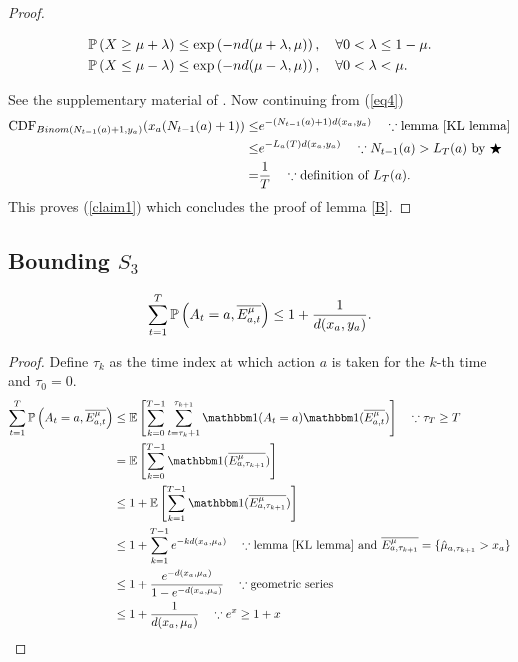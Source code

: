 \documentclass[11pt]{article}
\begin{document}
\begin{proof}
\begin{lemma}
\begin{align*}&\mathbb{P}\left( X\ge \mu+\lambda \right) \le \exp\left(-nd(\mu+\lambda,\mu)\right),\quad \forall 0 < \lambda \le 1-\mu.\\
&\mathbb{P}\left( X \le \mu-\lambda \right) \le \exp\left(-nd(\mu-\lambda,\mu)\right), \quad \forall 0 < \lambda < \mu.
\end{align*}
\end{lemma}
See the supplementary material of \cite{agrawal2013further}. Now continuing from (\ref{eq4})
\begin{align*}\mathrm{CDF}_{Binom(N_{t-1}(a)+1,y_a)}(x_a(N_{t-1}(a)+1)) \le &e^{-(N_{t-1}(a)+1)d(x_a,y_a)} \quad \because \mbox{lemma \ref{KL lemma}}\\
\le &e^{-L_a(T)d(x_a,y_a)} \quad \because \mbox{$N_{t-1}(a) > L_T(a)$ by $\bigstar$} \\
= &\frac{1}{T} \quad \because \mbox{definition of $L_T(a)$.}\end{align*}
This proves (\ref{claim1}) which concludes the proof of lemma \ref{B}.
\end{proof}

\subsection{Bounding $S_3$}
\begin{lemma}\label{C}
$$\sum_{t=1}^T  \mathbb{P}\left( A_t = a, \overline{E^{\mu}_{a,t}} \right)\le 1 + \frac{1}{d(x_a,y_a)}.$$
\end{lemma}
\begin{proof}
Define $\tau_k$ as the time index at which action $a$ is taken for the $k$-th time and $\tau_0 = 0$.
\begin{align*}
\sum_{t=1}^T  \prob{A_t = a, \overline{E^{\mu}_{a,t}}} &\le \E{\sum_{k=0}^{T-1} \sum_{t= \tau_k +1}^{\tau_{k+1}} \ind(A_t =a) \ind(\overline{E^\mu_{a,t}})} \quad \because \tau_{T} \ge T\\
 &= \E{\sum_{k=0}^{T-1}\ind(\overline{E^\mu_{a,\tau_{k+1}}})}\\
 &\le 1+\E{\sum_{k=1}^{T-1}\ind(\overline{E^\mu_{a,\tau_{k+1}}})}\\
  &\le 1+\sum_{k=1}^{T-1} e^{-kd(x_a,\mu_a)} \quad \because \mbox{lemma \ref{KL lemma} and } \overline{E^\mu_{a,\tau_{k+1}}}= \{\hat{\mu}_{a,\tau_{k+1}} > x_a \}\\
  &\le 1+\frac{e^{-d(x_a,\mu_a)}}{1-e^{-d(x_a,\mu_a)} }\quad \because \mbox{geometric series}\\
  &\le 1+\frac{1}{d(x_a,\mu_a)}\quad \because e^x \ge 1 + x
\end{align*}
\end{proof}
\end{document}
